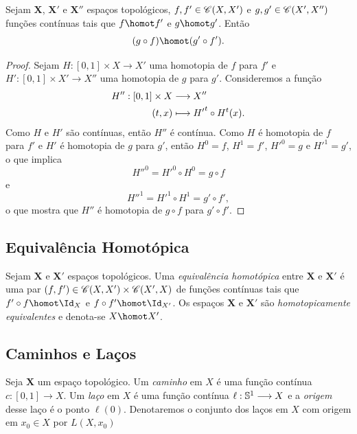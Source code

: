 \begin{prop}
Sejam $\bm X$, $\bm X'$ e $\bm X''$ espaços topológicos, $f,f' \in \cont(X,X')$ e $g,g' \in \cont(X',X'')$ funções contínuas tais que $f \homot f'$ e $g \homot g'$. Então
	\begin{equation*}
	(g \circ f) \homot (g' \circ f').
	\end{equation*}
\end{prop}
\begin{proof}
Sejam $H\colon [0,1] \times X \to X'$ uma homotopia de $f$ para $f'$ e $H': [0,1] \times X' \to X''$ uma homotopia de $g$ para $g'$. Consideremos a função
	\begin{align*}
	\func{H''}{[0,1] \times X}{X''}{(t,x)}{{H'}^t \circ H^t(x)}.
	\end{align*}
Como $H$ e $H'$ são contínuas, então $H''$ é contínua. Como $H$ é homotopia de $f$ para $f'$ e $H'$ é homotopia de $g$ para $g'$, então $H^0 = f$, $H^1 = f'$, ${H'}^0 = g$ e ${H'}^1 = g'$, o que implica
	\begin{equation*}
	{H''}^0 = {H'}^0 \circ H^0 = g \circ f
	\end{equation*}
e
	\begin{equation*}
	{H''}^1 = {H'}^1 \circ H^1 = g' \circ f',
	\end{equation*}
o que mostra que $H''$ é homotopia de $g \circ f$ para $g' \circ f'$.
\end{proof}

\subsection{Equivalência Homotópica}

\begin{defi}
Sejam $\bm X$ e $\bm X'$ espaços topológicos. Uma \emph{equivalência homotópica} entre $\bm X$ e $\bm X'$ é uma par $(f,f') \in \cont(X,X') \times \cont(X',X)$ de funções contínuas tais que $f' \circ f \homot \Id_X$ e $f \circ f' \homot \Id_{X'}$. Os espaços $\bm X$ e $\bm X'$ são \emph{homotopicamente equivalentes} e denota-se $X \homot X'$.
\end{defi}

\subsection{Caminhos e Laços}

\begin{defi}
Seja $\bm X$ um espaço topológico. Um \textit{caminho} em $X$ é uma função contínua $c\colon [0,1] \to X$. Um \textit{laço} em $X$ é uma função contínua $\ell: \S^1 \to X$ e a \emph{origem} desse laço é o ponto $\ell(0)$. Denotaremos o conjunto dos laços em $X$ com origem em $x_0 \in X$ por $L(X,x_0)$
\end{defi}

